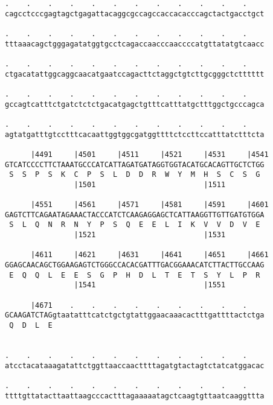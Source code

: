 \documentclass{article}
\begin{document}
\begin{Verbatim}
.    .    .    .    .    .    .    .    .    .    .    .    
cagcctcccgagtagctgagattacaggcgccagccaccacacccagctactgacctgct
                                                            
.    .    .    .    .    .    .    .    .    .    .    .    
tttaaacagctgggagatatggtgcctcagaccaacccaaccccatgttatatgtcaacc
                                                            
.    .    .    .    .    .    .    .    .    .    .    .    
ctgacatattggcaggcaacatgaatccagacttctaggctgtcttgcgggctctttttt
                                                            
.    .    .    .    .    .    .    .    .    .    .    .    
gccagtcatttctgatctctctgacatgagctgtttcatttatgctttggctgcccagca
                                                            
.    .    .    .    .    .    .    .    .    .    .    .    
agtatgatttgtcctttcacaattggtggcgatggttttctccttccatttatctttcta
                                                            
      |4491     |4501     |4511     |4521     |4531     |4541
GTCATCCCCTTCTAAATGCCCATCATTAGATGATAGGTGGTACATGCACAGTTGCTCTGG
 S  S  P  S  K  C  P  S  L  D  D  R  W  Y  M  H  S  C  S  G 
                |1501                         |1511         
  
      |4551     |4561     |4571     |4581     |4591     |4601
GAGTCTTCAGAATAGAAACTACCCATCTCAAGAGGAGCTCATTAAGGTTGTTGATGTGGA
 S  L  Q  N  R  N  Y  P  S  Q  E  E  L  I  K  V  V  D  V  E 
                |1521                         |1531         
  
      |4611     |4621     |4631     |4641     |4651     |4661
GGAGCAACAGCTGGAAGAGTCTGGGCCACACGATTTGACGGAAACATCTTACTTGCCAAG
 E  Q  Q  L  E  E  S  G  P  H  D  L  T  E  T  S  Y  L  P  R 
                |1541                         |1551         
  
      |4671    .    .    .    .    .    .    .    .    .    
GCAAGATCTAGgtaatatttcatctgctgtattggaacaaacactttgattttactctga
 Q  D  L  E                                                 
                                                            
  
.    .    .    .    .    .    .    .    .    .    .    .    
atcctacataaagatattctggttaaccaacttttagatgtactagtctatcatggacac
                                                            
.    .    .    .    .    .    .    .    .    .    .    .    
ttttgttatacttaattaagcccactttagaaaaatagctcaagtgttaatcaaggttta
                                                            

\end{Verbatim}
\end{document}
